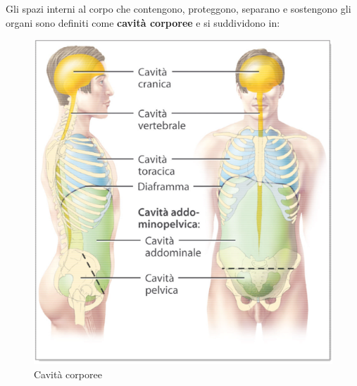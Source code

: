 \documentclass[a4paper]{article}
\begin{document}
Gli spazi interni al corpo che contengono, proteggono, separano e sostengono
gli organi sono definiti come \textbf{cavità corporee} e si suddividono in:
\begin{figure}[H]
    \centering
    \includegraphics[scale=0.3]{figures/holes.png}
    \caption{Cavità corporee}
\end{figure}
\end{document}
